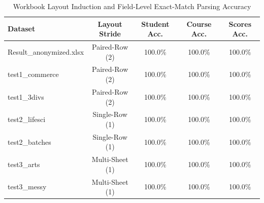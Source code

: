 \begin{table}[h]
\centering
\small
\caption{Workbook Layout Induction and Field-Level Exact-Match Parsing Accuracy}
\label{tab:parsing}
\begin{tabular}{lcccc}
\toprule
\textbf{Dataset} & \textbf{Layout Stride} & \textbf{Student Acc.} & \textbf{Course Acc.} & \textbf{Scores Acc.} \\
\midrule
Result\_anonymized.xlsx & Paired-Row (2) & 100.0\% & 100.0\% & 100.0\% \\
test1\_commerce & Paired-Row (2) & 100.0\% & 100.0\% & 100.0\% \\
test1\_3divs & Paired-Row (2) & 100.0\% & 100.0\% & 100.0\% \\
test2\_lifesci & Single-Row (1) & 100.0\% & 100.0\% & 100.0\% \\
test2\_batches & Single-Row (1) & 100.0\% & 100.0\% & 100.0\% \\
test3\_arts & Multi-Sheet (1) & 100.0\% & 100.0\% & 100.0\% \\
test3\_messy & Multi-Sheet (1) & 100.0\% & 100.0\% & 100.0\% \\
\bottomrule
\end{tabular}
\end{table}
